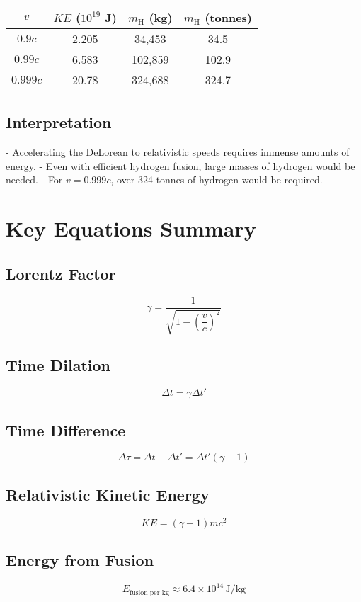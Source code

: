 \documentclass{article}
\begin{document}
\begin{multicols}{2}
\begin{center}
\begin{tabular}{@{}cccc@{}}
\toprule
\( v \) & \( KE \) (\( 10^{19} \) J) & \( m_{\text{H}} \) (kg) & \( m_{\text{H}} \) (tonnes) \\
\midrule
\( 0.9c \) & 2.205 & 34,453 & 34.5 \\
\( 0.99c \) & 6.583 & 102,859 & 102.9 \\
\( 0.999c \) & 20.78 & 324,688 & 324.7 \\
\bottomrule
\end{tabular}
\end{center}

\subsection*{Interpretation}

- Accelerating the DeLorean to relativistic speeds requires immense amounts of energy.
- Even with efficient hydrogen fusion, large masses of hydrogen would be needed.
- For \( v = 0.999c \), over 324 tonnes of hydrogen would be required.

\section*{Key Equations Summary}

\subsection*{Lorentz Factor}

\[
\gamma = \frac{1}{\sqrt{1 - \left( \dfrac{v}{c} \right)^2 }}
\]

\subsection*{Time Dilation}

\[
\Delta t = \gamma \Delta t'
\]

\subsection*{Time Difference}

\[
\Delta \tau = \Delta t - \Delta t' = \Delta t' (\gamma - 1)
\]

\subsection*{Relativistic Kinetic Energy}

\[
KE = (\gamma - 1) m c^2
\]

\subsection*{Energy from Fusion}

\[
E_{\text{fusion per kg}} \approx 6.4 \times 10^{14}\, \text{J/kg}
\]

\end{multicols}
\end{document}
